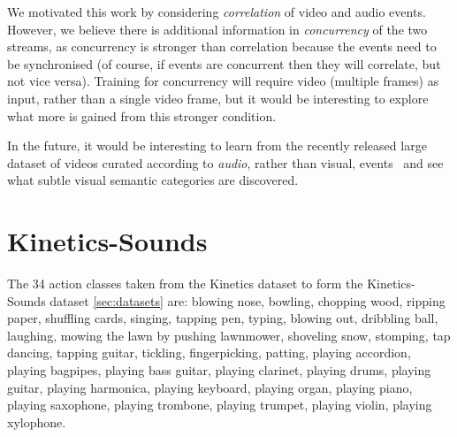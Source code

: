 \documentclass[10pt,twocolumn,letterpaper]{article}
\begin{document}
We motivated this work by considering {\em correlation} of video and audio
events. However, we believe there is additional information in \emph{concurrency}
of the two streams, as concurrency is stronger than correlation
because the events need to be
synchronised (of course, if events are concurrent then they will
correlate, but not vice versa). Training for concurrency will require
video (multiple frames) as input, rather than a single video frame,
but it would be interesting to explore what more is gained from this
stronger condition.

In the future,
it would be interesting to learn
from the recently released large dataset of videos curated according to
{\em audio}, rather than visual, events~\cite{Gemmeke17} and see what subtle
visual semantic categories are discovered.


{\small


}

\appendix
\section{Kinetics-Sounds}
\label{sec:kineticssounds}
The 34 action classes taken from the Kinetics dataset \cite{Kay17} to form
the Kinetics-Sounds dataset \ref{sec:datasets} are:
blowing nose,
bowling,
chopping wood,
ripping paper,
shuffling cards,
singing,
tapping pen,
typing,
blowing out,
dribbling ball,
laughing,
mowing the lawn by pushing lawnmower,
shoveling snow,
stomping,
tap dancing,
tapping guitar,
tickling,
fingerpicking,
patting,
playing accordion,
playing bagpipes,
playing bass guitar,
playing clarinet,
playing drums,
playing guitar,
playing harmonica,
playing keyboard,
playing organ,
playing piano,
playing saxophone,
playing trombone,
playing trumpet,
playing violin,
playing xylophone.
\end{document}
